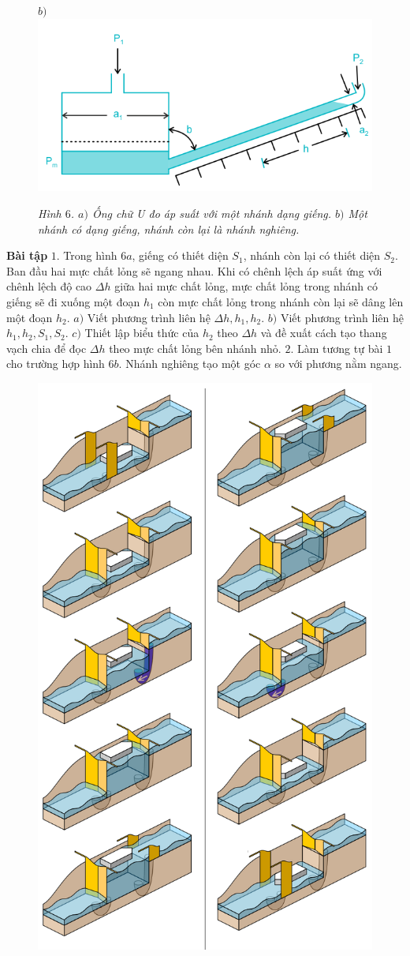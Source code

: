 \begin{multicols}{2}
\begin{figure}[H]
		$b)$\includegraphics[height = 0.31\linewidth]{11}
		\caption{\small\textit{\color{timhieukhoahoc}Hình $6$. $a)$ Ống chữ U đo áp suất với một nhánh dạng giếng. $b)$ Một nhánh có dạng giếng, nhánh còn lại là nhánh nghiêng.}}
		\vspace*{-10pt}
	\end{figure}
	\textbf{\color{timhieukhoahoc}Bài tập}
	\vskip 0.1cm
	$1$. Trong hình $6a$, giếng có thiết diện $S_1$, nhánh còn lại có thiết diện $S_2$. Ban đầu hai mực chất lỏng sẽ ngang nhau. Khi có chênh lệch áp suất ứng với chênh lệch độ cao $\Delta h$ giữa hai mực chất lỏng, mực chất lỏng trong nhánh có giếng sẽ đi xuống một đoạn $h_1$ còn mực chất lỏng trong nhánh còn lại sẽ dâng lên một đoạn $h_2$.
	\vskip 0.1cm
	$a)$ Viết phương trình liên hệ $\Delta h,h_1,h_2$.
	\vskip 0.1cm
	$b)$ Viết phương trình liên hệ $h_1,h_2,S_1,S_2$.
	\vskip 0.1cm
	$c)$ Thiết lập biểu thức của $h_2$ theo $\Delta h$ và đề xuất cách tạo thang vạch chia để đọc $\Delta h$ theo mực chất lỏng bên nhánh nhỏ.
	\vskip 0.1cm
	$2.$ Làm tương tự bài $1$ cho trường hợp hình $6b$. Nhánh nghiêng tạo một góc $\alpha$ so với phương nằm ngang.
	\begin{figure}[H]
		\vspace*{-5pt}
		\centering
		\captionsetup{labelformat= empty, justification=centering}
		\includegraphics[width= 0.5\linewidth]{12}

\end{figure}
\end{multicols}

